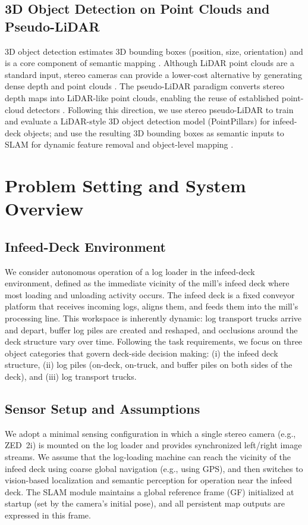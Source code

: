 \documentclass[letterpaper, 10 pt, conference]{IEEEtran}  %
\begin{document}
\subsection{3D Object Detection on Point Clouds and Pseudo-LiDAR}
3D object detection estimates 3D bounding boxes (position, size, orientation) and is a core component of semantic mapping \cite{c3}. Although LiDAR point clouds are a standard input, stereo cameras can provide a lower-cost alternative by generating dense depth and point clouds \cite{c17}. The pseudo-LiDAR paradigm converts stereo depth maps into LiDAR-like point clouds, enabling the reuse of established point-cloud detectors \cite{c17}. Following this direction, we use stereo pseudo-LiDAR to train and evaluate a LiDAR-style 3D object detection model (PointPillars) for infeed-deck objects; and use the resulting 3D bounding boxes as semantic inputs to SLAM for dynamic feature removal and object-level mapping \cite{c19,cXX,c7}.



\section{Problem Setting and System Overview}
\label{sec:problem_system}

\subsection{Infeed-Deck Environment}
We consider autonomous operation of a log loader in the infeed-deck environment, defined as the immediate vicinity of the mill’s infeed deck where most loading and unloading activity occurs. The infeed deck is a fixed conveyor platform that receives incoming logs, aligns them, and feeds them into the mill’s processing line.
This workspace is inherently dynamic: log transport trucks arrive and depart, buffer log piles are created and reshaped, and occlusions around the deck structure vary over time.
Following the task requirements, we focus on three object categories that govern deck-side decision making: (i) the infeed deck structure, (ii) log piles (on-deck, on-truck, and buffer piles on both sides of the deck), and (iii) log transport trucks.

\subsection{Sensor Setup and Assumptions}
We adopt a minimal sensing configuration in which a single stereo camera (e.g., ZED~2i) is mounted on the log loader and provides synchronized left/right image streams.
We assume that  the log-loading machine can reach the vicinity of the infeed deck using coarse global navigation (e.g., using GPS), and then switches to vision-based localization and semantic perception for operation near the infeed deck.
The SLAM module maintains a global reference frame (GF) initialized at startup (set by the camera’s initial pose), and all persistent map outputs are expressed in this frame.
\end{document}
